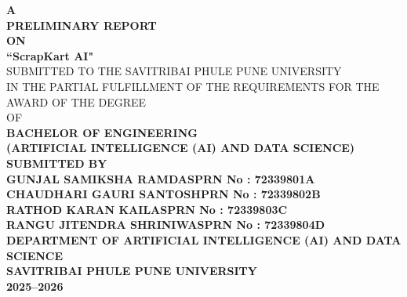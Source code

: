 \begin{titlepage}

    \vspace*{1cm}
    \begin{center}
    {\Large \textbf{A}}\\[0.5cm]
    {\Large \textbf{ PRELIMINARY REPORT}}\\[0.5cm]
    {\Large \textbf{ ON}}\\[0.5cm]
        {\huge \textbf{``ScrapKart AI"}}\\[1.5em]
        {\normalsize SUBMITTED TO THE SAVITRIBAI PHULE PUNE UNIVERSITY}\\
        {\normalsize IN THE PARTIAL FULFILLMENT OF THE REQUIREMENTS FOR THE AWARD OF THE DEGREE}\\[0.75em]
        
        {\normalsize OF}\\[0.5em]
        
        {\large \textbf{BACHELOR OF ENGINEERING\\(ARTIFICIAL INTELLIGENCE (AI) AND DATA SCIENCE)}}\\[1.5em]
        {\large \textbf{SUBMITTED BY}}\\[1.5em]
    {\normalsize \textbf{GUNJAL SAMIKSHA RAMDAS}}\hfill {\normalsize \textbf{PRN No : 72339801A }}\\
    {\normalsize \textbf{CHAUDHARI GAURI SANTOSH}}\hfill {\normalsize \textbf{PRN No : 72339802B }}\\
    {\normalsize \textbf{RATHOD KARAN KAILAS}}\hfill {\normalsize \textbf{PRN No : 72339803C }}\\
     {\normalsize \textbf{RANGU JITENDRA SHRINIWAS}}\hfill {\normalsize \textbf{PRN No : 72339804D }}\\[0.3em]
        \centering
        \vspace{0cm} %
        {\large \textbf{DEPARTMENT OF ARTIFICIAL INTELLIGENCE (AI) AND DATA SCIENCE}}\\[1em]
        {\normalsize \textbf{SAVITRIBAI PHULE PUNE UNIVERSITY\\
        2025--2026}}
    \end{center}
    \vfill
\end{titlepage}

